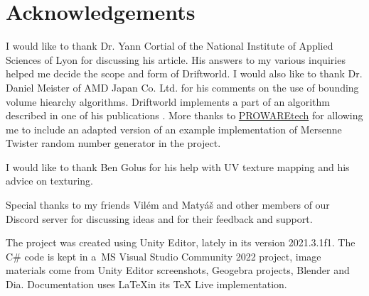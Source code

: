 \section*{Acknowledgements}

I would like to thank Dr. Yann Cortial of the National Institute of Applied Sciences of Lyon for discussing his article. His answers to my various inquiries helped me decide the scope and form of Driftworld. I would also like to thank Dr. Daniel Meister of AMD Japan Co. Ltd. for his comments on the use of bounding volume hiearchy algorithms. Driftworld implements a part of an algorithm described in one of his publications \cite{meister}. More thanks to \href{https://www.prowaretech.com}{PROWAREtech} for allowing me to include an adapted version of an example implementation of Mersenne Twister random number generator in the project.

I would like to thank Ben Golus for his help with UV texture mapping and his advice on texturing. %

Special thanks to my friends Vilém and Matyáš and other members of our Discord server for discussing ideas and for their feedback and support.

The project was created using Unity Editor, lately in its version 2021.3.1f1. The C\# code is kept in a~MS Visual Studio Community 2022 project, image materials come from Unity Editor screenshots, Geogebra projects, Blender and Dia. Documentation uses \LaTeX\hspace*{0.3em}in its TeX Live implementation.